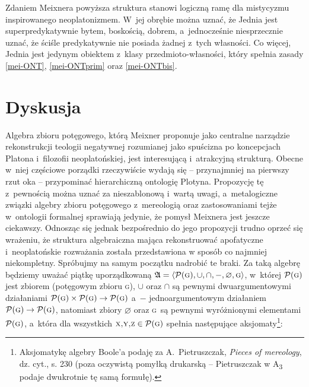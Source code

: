 Zdaniem Meixnera powyższa struktura stanowi logiczną ramę dla mistycyzmu inspirowanego neoplatonizmem. W~jej obrębie można uznać, że Jednia jest superpredykatywnie bytem, boskością, dobrem, a~jednocześnie niesprzecznie uznać, że ściśle predykatywnie nie posiada żadnej z~tych własności. Co więcej, Jednia jest jedynym obiektem z~klasy przedmioto-własności, który spełnia zasady \ref{mei-ONT}, \ref{mei-ONTprim} oraz \ref{mei-ONTbis}.

\section{Dyskusja}

Algebra zbioru potęgowego, którą Meixner proponuje jako centralne narządzie rekonstrukcji teologii negatywnej rozumianej jako spuścizna po koncepcjach Platona i~filozofii neoplatońskiej, jest interesującą i~atrakcyjną strukturą. Obecne w~niej częściowe porządki rzeczywiście wydają się -- przynajmniej na pierwszy rzut oka -- przypominać hierarchiczną ontologię Plotyna. Propozycję tę z~pewnością można uznać za nieszablonową i~wartą uwagi, a~metalogiczne związki algebry zbioru potęgowego z~mereologią oraz zastosowaniami tejże w~ontologii formalnej sprawiają jedynie, że pomysł Meixnera jest jeszcze ciekawszy. Odnosząc się jednak bezpośrednio do jego propozycji trudno oprzeć się wrażeniu, że struktura algebraiczna mająca rekonstruować apofatyczne i~neoplatońskie rozważania została przedstawiona w sposób co najmniej niekompletny. Spróbujmy na samym początku nadrobić te braki. Za taką algebrę będziemy uważać piątkę uporządkowaną $\mathfrak{A} = \langle \mathcal{P}(\textsc{g}), \cup, \cap, -, \varnothing, \textsc{g}\rangle$, w~której $\mathcal{P}(\textsc{g})$ jest zbiorem (potęgowym zbioru \textsc{g}), $\cup$ oraz $\cap$ są pewnymi dwuargumentowymi działaniami $\mathcal{P}(\textsc{g}) \times \mathcal{P}(\textsc{g}) \to \mathcal{P}(\textsc{g})$ a~$-$ jednoargumentowym działaniem $\mathcal{P}(\textsc{g}) \to \mathcal{P}(\textsc{g})$, natomiast zbiory $\varnothing$ oraz \textsc{g}~są pewnymi wyróżnionymi elementami $\mathcal{P}(\textsc{g})$, a~która dla wszystkich $\textsc{x,y,z}\in\mathcal{P}(\textsc{g})$ spełnia następujące aksjomaty\footnote{Aksjomatykę algebry Boole'a podaję za A.~Pietruszczak, \textit{Pieces of mereology}, dz. cyt., s. 230 (poza oczywistą pomyłką drukarską -- Pietruszczak w A\textsubscript{3} podaje dwukrotnie tę samą formułę).}:


